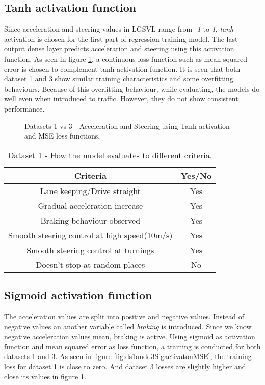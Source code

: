 \subsection{Tanh activation function}
Since acceleration and steering values in LGSVL range from \textit{-1} to \textit{1},
\textit{tanh} activation is chosen for the first part of regression training model. The
last output dense layer predicts acceleration and steering using this activation function.
As seen in figure \ref{fig:ds1andd3tanhactivatonMSE}, a continuous loss function such as
mean squared error is chosen to complement tanh activation function. It is seen that both
dataset 1 and 3 show similar training characteristics and some overfitting behaviours.
Because of this overfitting behaviour, while evaluating, the models do well even when
introduced to traffic. However, they do not show consistent performance.
\begin{figure}[h]
	\centering
    \def\svgwidth{\textwidth}
    \caption{Datasets 1 vs 3 - Acceleration and Steering using Tanh activation and MSE loss
    functions.}
    \label{fig:ds1andd3tanhactivatonMSE}
\end{figure}
\begin{table}[h]
    \centering
\begin{tabular}{|c c|}
    \hline
    Criteria & Yes/No \\\hline
    Lane keeping/Drive straight  & Yes   \\
    Gradual acceleration increase & Yes \\
    Braking behaviour observed & Yes \\
    Smooth steering control at high speed(10m/s) & Yes \\
    Smooth steering control at turnings & Yes \\
    Doesn't stop at random places & No \\\hline
\end{tabular}
\caption{Dataset 1 - How the model evaluates to different criteria.}
\label{table:tanhmse}
\end{table}
\subsection{Sigmoid activation function}
The acceleration values are split into positive and negative values. Instead of negative
values an another variable called \textit{braking} is introduced. Since we know negative
acceleration values mean, braking is active. Using sigmoid as activation function and mean
squared error as loss function, a training is conducted for both datasets 1 and 3. As seen
in figure \ref{fig:ds1andd3SigactivatonMSE}, the training loss for dataset 1 is close to
zero. And dataset 3 losses are slightly higher and close its values in figure
\ref{fig:ds1andd3tanhactivatonMSE}.

